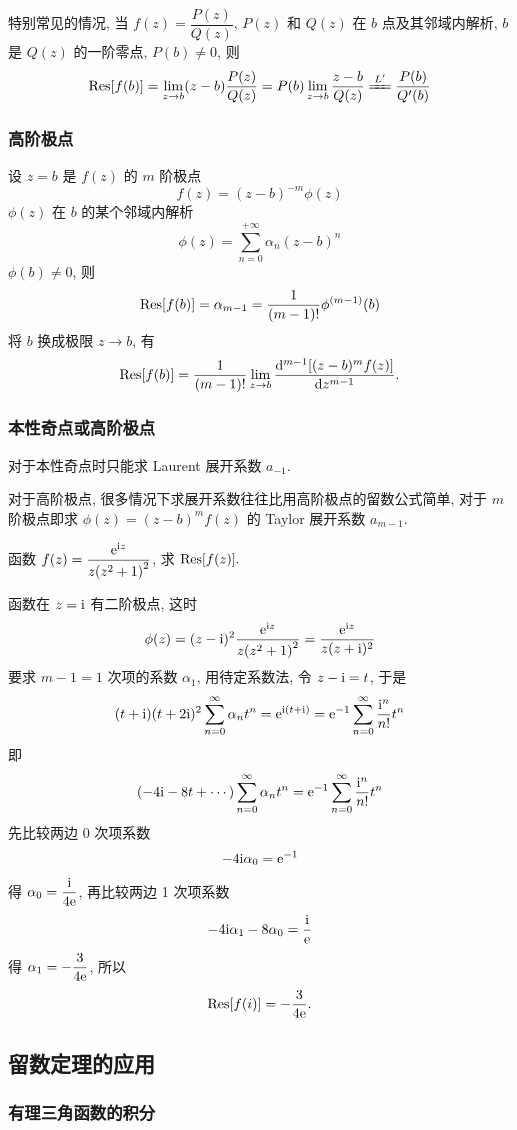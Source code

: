 特别常见的情况, 当 $f(z)=\dfrac{P(z)}{Q(z)}$, $P(z)$ 和 $Q(z)$ 在 $b$ 点及其邻域内解析, $b$ 是 $Q(z)$ 的一阶零点, $P(b)\neq0$, 则
$$\Res[f(b)]=\lim_{z\to b}(z-b)\dfrac{P(z)}{Q(z)}=P(b)\lim_{z\to b}\dfrac{z-b}{Q(z)}\xlongequal[]{L'}\dfrac{P(b)}{Q'(b)}$$

\subsubsection{高阶极点}

设 $z=b$ 是 $f(z)$ 的 $m$ 阶极点 $$f(z)=(z-b)^{-m}\phi(z)$$
$\phi(z)$ 在 $b$ 的某个邻域内解析 $$\phi(z)=\sum_{n=0}^{+\infty}\alpha_n(z-b)^n$$
$\phi(b)\neq0$, 则 $$\Res[f(b)]=\alpha_{m-1}=\dfrac{1}{(m-1)!}\phi^{(m-1)}(b)$$
将 $b$ 换成极限 $z\to b$, 有
$$\Res[f(b)]=\dfrac{1}{(m-1)!}\lim_{z\to b}\dv[m-1]{\qty[(z-b)^mf(z)]}{z}.$$

\subsubsection{本性奇点或高阶极点}

对于本性奇点时只能求 Laurent 展开系数 $a_{-1}$.

对于高阶极点, 很多情况下求展开系数往往比用高阶极点的留数公式简单, 对于 $m$ 阶极点即求 $\phi(z)=(z-b)^mf(z)$ 的 Taylor 展开系数 $a_{m-1}$.

\begin{example}
    函数 $f(z)=\dfrac{\mathrm{e}^{\mathrm{i} z}}{z\qty(z^2+1)^2}$, 求 $\Res[f(z)].$
\end{example}
\begin{solution}
    函数在 $z=\mathrm{i}$ 有二阶极点, 这时
    $$\phi(z)=(z-\mathrm{i})^2\dfrac{\mathrm{e}^{\mathrm{i} z}}{z\qty(z^2+1)^2}=\dfrac{\mathrm{e}^{\mathrm{i} z}}{z(z+\mathrm{i})^2}$$
    要求 $m-1=1$ 次项的系数 $\alpha_1$, 用待定系数法, 令 $z-\mathrm{i}=t$, 于是
    $$(t+\mathrm{i})(t+2\mathrm{i})^2\sum_{n=0}^{\infty}\alpha_nt^n=\mathrm{e}^{\mathrm{i}(t+\mathrm{i})}=\mathrm{e}^{-1}\sum_{n=0}^{\infty}\dfrac{\mathrm{i}^n}{n!}t^n$$
    即 $$(-4\mathrm{i}-8t+\cdots)\sum_{n=0}^{\infty}\alpha_nt^n=\mathrm{e}^{-1}\sum_{n=0}^{\infty}\dfrac{\mathrm{i} ^n}{n!}t^n$$
    先比较两边 $0$ 次项系数 $$-4\mathrm{i} \alpha_0=\mathrm{e}^{-1}$$
    得 $\alpha_0=\dfrac{\mathrm{i}}{4\mathrm{e}}$, 再比较两边 1 次项系数 $$-4\mathrm{i}\alpha_1-8\alpha_0=\dfrac{\mathrm{i}}{\mathrm{e}}$$
    得 $\alpha_1=-\dfrac{3}{4\mathrm{e}}$, 所以 $$\Res[f(i)]=-\dfrac{3}{4\e}.$$
\end{solution}

\subsection{留数定理的应用}

\subsubsection{有理三角函数的积分}

